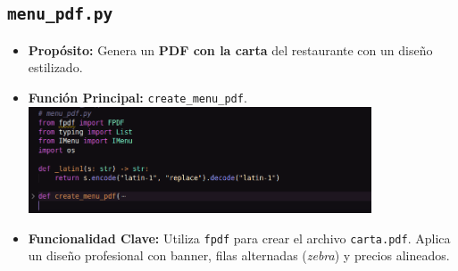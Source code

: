 \documentclass[a4paper, 12pt]{article}
\begin{document}
\subsection{\texttt{menu\_pdf.py}}
\begin{itemize}
    \item \textbf{Propósito:} Genera un \textbf{PDF con la carta} del restaurante con un diseño estilizado.
    \item \textbf{Función Principal:} \texttt{create\_menu\_pdf}.\\
\includegraphics[width=0.8\textwidth]{images/9.png}
    \item \textbf{Funcionalidad Clave:} Utiliza \texttt{fpdf} para crear el archivo \texttt{carta.pdf}. Aplica un diseño profesional con banner, filas alternadas (\textit{zebra}) y precios alineados.
\end{itemize}
\newpage
\end{document}
